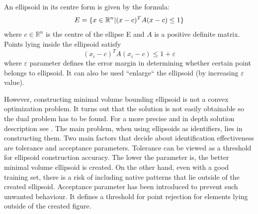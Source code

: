 An ellipsoid in its centre form is given by the formula:
\vspace{-6pt} 
\[ 
\vspace{-3pt}
E = \{x \in \mathbb{R}^{n} | (x - c)^{T}A(x-c) \le 1\} 
\vspace{-3pt}
\] 
where $c \in \mathbb{R}^{n}$ is the centre of the ellipse E and $ A $ is a positive definite matrix. Points lying inside the ellipsoid satisfy 
\begin{equation}\label{eq:ellipsoid_affiliation}(x_{i} - c)^{T}A(x_{i} - c) \le 1 + \varepsilon\end{equation}
where $\varepsilon$ parameter defines the error margin in determining whether certain point belongs to ellipsoid. It can also be used ``enlarge`` the ellipsoid (by increasing $\varepsilon$ value).%

However, constructing minimal volume bounding ellipsoid is not a convex optimization problem. It turns out that the solution is not easily obtainable so the dual problem has to be found. For a more precise and in depth solution description see \cite{MVEEMichaelTodd2005}. The main problem, when using ellipsoids as identifiers, lies in constructing them. Two main factors that decide about identification effectiveness are tolerance and acceptance parameters. Tolerance can be viewed as a threshold for ellipsoid construction accuracy. The lower the parameter is, the better minimal volume ellipsoid is created. On the other hand, even with a good training set, there is a risk of including native patterns that lie outside of the created ellipsoid. Acceptance parameter has been introduced to prevent such unwanted behaviour. It defines a threshold for point rejection for elements lying outside of the created figure.